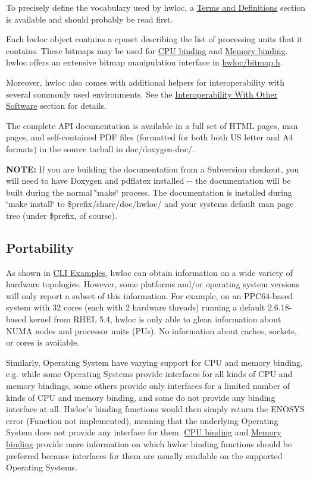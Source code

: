 To precisely define the vocabulary used by hwloc, a \hyperlink{a00001}{Terms and Definitions} section is available and should probably be read first.

Each hwloc object contains a cpuset describing the list of processing units that it contains. These bitmaps may be used for \hyperlink{a00049}{CPU binding} and \hyperlink{a00050}{Memory binding}. hwloc offers an extensive bitmap manipulation interface in \hyperlink{a00027_source}{hwloc/bitmap.h}.

Moreover, hwloc also comes with additional helpers for interoperability with several commonly used environments. See the \hyperlink{a00008}{Interoperability With Other Software} section for details.

The complete API documentation is available in a full set of HTML pages, man pages, and self-\/contained PDF files (formatted for both both US letter and A4 formats) in the source tarball in doc/doxygen-\/doc/.

{\bfseries NOTE:} If you are building the documentation from a Subversion checkout, you will need to have Doxygen and pdflatex installed -\/-\/ the documentation will be built during the normal \char`\"{}make\char`\"{} process. The documentation is installed during \char`\"{}make install\char`\"{} to \$prefix/share/doc/hwloc/ and your systems default man page tree (under \$prefix, of course).\hypertarget{index_portability}{}\subsection{Portability}\label{index_portability}
As shown in \hyperlink{index_cli_examples}{CLI Examples}, hwloc can obtain information on a wide variety of hardware topologies. However, some platforms and/or operating system versions will only report a subset of this information. For example, on an PPC64-\/based system with 32 cores (each with 2 hardware threads) running a default 2.6.18-\/based kernel from RHEL 5.4, hwloc is only able to glean information about NUMA nodes and processor units (PUs). No information about caches, sockets, or cores is available.

Similarly, Operating System have varying support for CPU and memory binding, e.g. while some Operating Systems provide interfaces for all kinds of CPU and memory bindings, some others provide only interfaces for a limited number of kinds of CPU and memory binding, and some do not provide any binding interface at all. Hwloc's binding functions would then simply return the ENOSYS error (Function not implemented), meaning that the underlying Operating System does not provide any interface for them. \hyperlink{a00049}{CPU binding} and \hyperlink{a00050}{Memory binding} provide more information on which hwloc binding functions should be preferred because interfaces for them are usually available on the supported Operating Systems.

